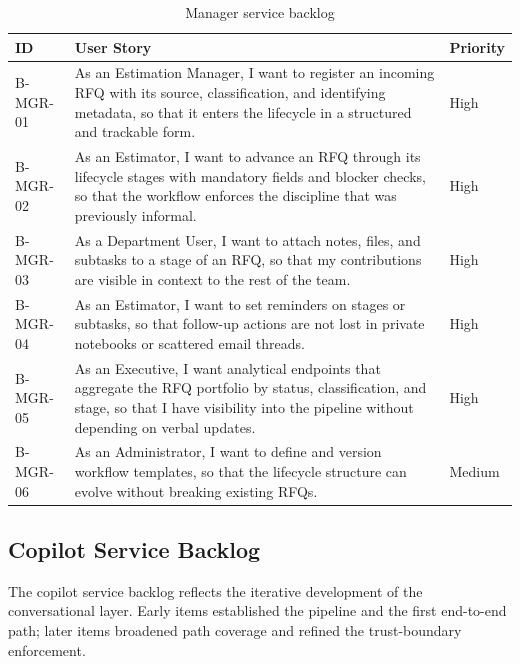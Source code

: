 \begin{table}[H]
\centering
\renewcommand{\arraystretch}{1.3}
\begin{tabular}{|p{1.4cm}|p{10.6cm}|p{1.5cm}|}
\hline
\rowcolor{lightgray}
\textbf{ID} & \textbf{User Story} & \textbf{Priority} \\ \hline
B-MGR-01 & As an Estimation Manager, I want to register an incoming RFQ with its source, classification, and identifying metadata, so that it enters the lifecycle in a structured and trackable form. & High \\ \hline
B-MGR-02 & As an Estimator, I want to advance an RFQ through its lifecycle stages with mandatory fields and blocker checks, so that the workflow enforces the discipline that was previously informal. & High \\ \hline
B-MGR-03 & As a Department User, I want to attach notes, files, and subtasks to a stage of an RFQ, so that my contributions are visible in context to the rest of the team. & High \\ \hline
B-MGR-04 & As an Estimator, I want to set reminders on stages or subtasks, so that follow-up actions are not lost in private notebooks or scattered email threads. & High \\ \hline
B-MGR-05 & As an Executive, I want analytical endpoints that aggregate the RFQ portfolio by status, classification, and stage, so that I have visibility into the pipeline without depending on verbal updates. & High \\ \hline
B-MGR-06 & As an Administrator, I want to define and version workflow templates, so that the lifecycle structure can evolve without breaking existing RFQs. & Medium \\ \hline
\end{tabular}
\caption{Manager service backlog}
\label{tab:backlog_manager}
\end{table}

\subsection*{Copilot Service Backlog}
The copilot service backlog reflects the iterative development of the conversational layer. Early items established the pipeline and the first end-to-end path; later items broadened path coverage and refined the trust-boundary enforcement.

